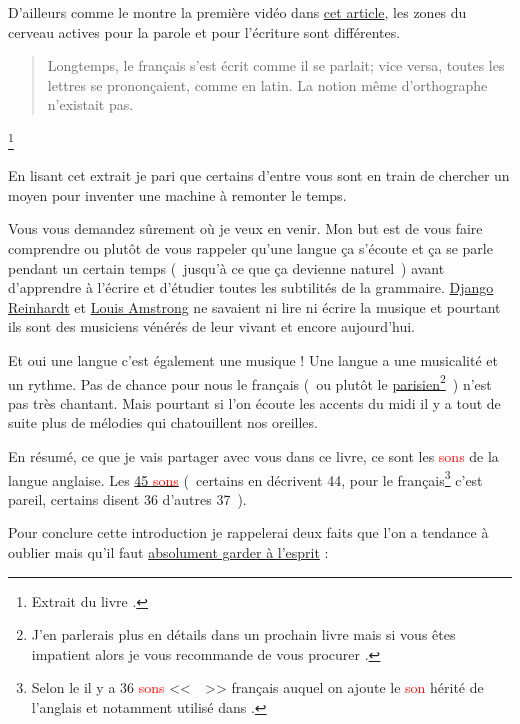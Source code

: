 D'ailleurs comme le montre la première vidéo dans \href{http://doyouspeakenglish.fr/prescriptiviste-ou-descriptiviste/}{cet article}, les zones du cerveau actives
pour la parole et pour l'écriture sont différentes.\par

\begin{quote}
Longtemps, le français s'est écrit comme il se parlait; vice versa,
toutes les lettres se prononçaient, comme en latin. La notion même
d'orthographe n'existait pas.
\end{quote}\footnote{Extrait du livre \FL.}


En lisant cet extrait je pari que certains d'entre vous sont en train
de chercher un moyen pour inventer une machine à remonter le temps. 

Vous vous demandez sûrement où je veux en venir. Mon but est de vous
faire comprendre ou plutôt de vous rappeler qu'une langue ça s'écoute
et ça se parle pendant un certain temps (~jusqu'à ce que ça devienne
naturel~) avant d'apprendre à l'écrire et d'étudier toutes les
subtilités de la grammaire. \href{https://fr.wikipedia.org/wiki/Django\_Reinhardt}{Django Reinhardt} et \href{https://fr.wikipedia.org/wiki/Louis\_Armstrong}{Louis Amstrong} ne
savaient ni lire ni écrire la musique et pourtant ils sont des
musiciens vénérés de leur vivant et encore aujourd'hui.\par

Et oui une langue c'est également une musique ! Une langue a une
musicalité et un rythme. Pas de chance pour nous le français (~ou
plutôt le \underline{parisien}\footnote{J'en parlerais plus en détails
  dans un prochain livre mais si vous êtes impatient alors je vous
  recommande de vous procurer \FL.}~)
n'est pas très chantant. Mais pourtant si l'on écoute les accents du
midi il y a tout de suite plus de mélodies qui chatouillent nos
oreilles. 

En résumé, ce que je vais partager avec vous dans ce livre, ce
sont les \textcolor{red}{sons} de la langue anglaise. Les \href{https://pronunciationstudio.com/45-Sounds/}{45 \textcolor{red}{sons}} (~certains en
décrivent 44, pour le français\footnote{Selon le \GE il y a 36 \textcolor{red}{sons}
  <<~~>> français auquel on ajoute le \textcolor{red}{son} 
  hérité de l'anglais et notamment utilisé dans .} c'est
pareil, certains disent 36 d'autres 37~).\par

Pour conclure cette introduction je rappelerai deux faits que l'on a tendance à oublier mais qu'il faut \underline{absolument garder à l'esprit} :

